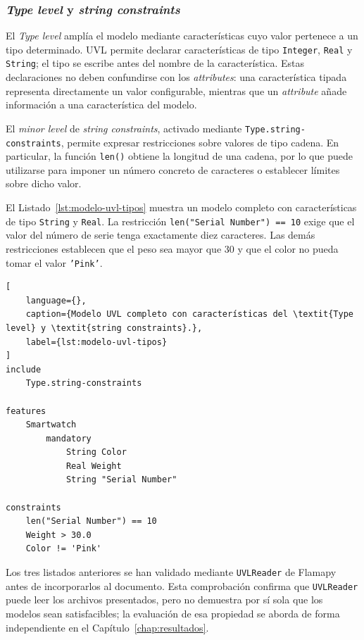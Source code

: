 \subsubsection{\textit{Type level} y \textit{string constraints}}

El \textit{Type level} amplía el modelo mediante características cuyo valor
pertenece a un tipo determinado. UVL permite declarar características de tipo
\texttt{Integer}, \texttt{Real} y \texttt{String}; el tipo se escribe antes
del nombre de la característica. Estas declaraciones no deben confundirse con
los \textit{attributes}: una característica tipada representa directamente un
valor configurable, mientras que un \textit{attribute} añade información a una
característica del modelo.

El \textit{minor level} de \textit{string constraints}, activado mediante
\texttt{Type.string-constraints}, permite expresar restricciones sobre valores
de tipo cadena. En particular, la función \texttt{len()} obtiene la longitud
de una cadena, por lo que puede utilizarse para imponer un número concreto de
caracteres o establecer límites sobre dicho valor.

El Listado~\ref{lst:modelo-uvl-tipos} muestra un modelo completo con
características de tipo \texttt{String} y \texttt{Real}. La restricción
\texttt{len("Serial Number") == 10} exige que el valor del número de serie
tenga exactamente diez caracteres. Las demás restricciones establecen que el
peso sea mayor que 30 y que el color no pueda tomar el valor
\texttt{'Pink'}.

\begin{lstlisting}[
    language={},
    caption={Modelo UVL completo con características del \textit{Type level} y \textit{string constraints}.},
    label={lst:modelo-uvl-tipos}
]
include
    Type.string-constraints

features
    Smartwatch
        mandatory
            String Color
            Real Weight
            String "Serial Number"

constraints
    len("Serial Number") == 10
    Weight > 30.0
    Color != 'Pink'
\end{lstlisting}

Los tres listados anteriores se han validado mediante \texttt{UVLReader} de
Flamapy antes de incorporarlos al documento. Esta comprobación confirma que \texttt{UVLReader} puede leer los archivos
presentados, pero no demuestra por sí sola que los modelos sean
satisfacibles;
la evaluación de esa propiedad se aborda de forma independiente en el
Capítulo~\ref{chap:resultados}.


